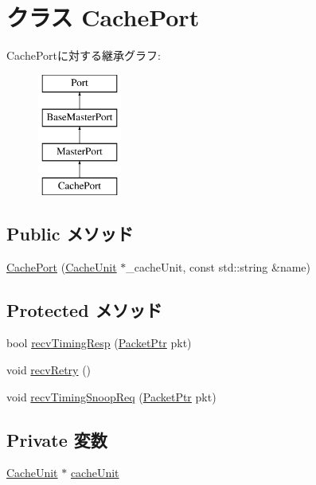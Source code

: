 \hypertarget{classInOrderCPU_1_1CachePort}{
\section{クラス CachePort}
\label{classInOrderCPU_1_1CachePort}
}
CachePortに対する継承グラフ:\begin{figure}[H]
\begin{center}
\leavevmode
\includegraphics[height=4cm]{classInOrderCPU_1_1CachePort}
\end{center}
\end{figure}
\subsection*{Public メソッド}
\begin{DoxyCompactItemize}
\item 
\hyperlink{classInOrderCPU_1_1CachePort_ad623fece786107fa06050327844b38d7}{CachePort} (\hyperlink{classCacheUnit}{CacheUnit} $\ast$\_\-cacheUnit, const std::string \&name)
\end{DoxyCompactItemize}
\subsection*{Protected メソッド}
\begin{DoxyCompactItemize}
\item 
bool \hyperlink{classInOrderCPU_1_1CachePort_a482dba5588f4bee43e498875a61e5e0b}{recvTimingResp} (\hyperlink{classPacket}{PacketPtr} pkt)
\item 
void \hyperlink{classInOrderCPU_1_1CachePort_a29cb5a4f98063ce6e9210eacbdb35298}{recvRetry} ()
\item 
void \hyperlink{classInOrderCPU_1_1CachePort_aff3031c56fc4947a19695c868bb8233e}{recvTimingSnoopReq} (\hyperlink{classPacket}{PacketPtr} pkt)
\end{DoxyCompactItemize}
\subsection*{Private 変数}
\begin{DoxyCompactItemize}
\item 
\hyperlink{classCacheUnit}{CacheUnit} $\ast$ \hyperlink{classInOrderCPU_1_1CachePort_a8abcb7a551e5f3b1e6061a0634c08624}{cacheUnit}
\end{DoxyCompactItemize}


